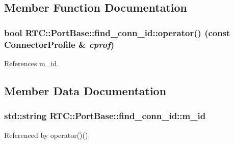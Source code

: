 \subsection{Member Function Documentation}
\subsubsection[{operator()}]{\setlength{\rightskip}{0pt plus 5cm}bool RTC::PortBase::find\_\-conn\_\-id::operator() (const ConnectorProfile \& {\em cprof})\hspace{0.3cm}{\ttfamily  [inline]}}\label{structRTC_1_1PortBase_1_1find__conn__id_ae6b3bf71f8ddb52f0be1c383e4fadbab}


References m\_\-id.



\subsection{Member Data Documentation}
\subsubsection[{m\_\-id}]{\setlength{\rightskip}{0pt plus 5cm}std::string {\bf RTC::PortBase::find\_\-conn\_\-id::m\_\-id}}\label{structRTC_1_1PortBase_1_1find__conn__id_afae0272a2a0305bcba9677266e0871d7}


Referenced by operator()().

